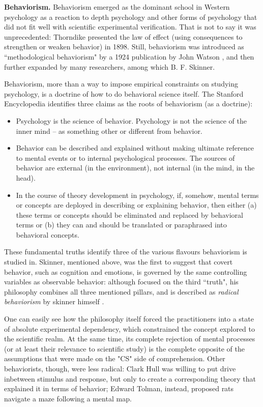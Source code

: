 \documentclass[../main.tex]{subfiles}
\begin{document}
\vspace{4pt}
\textbf{Behaviorism.}
Behaviorism emerged as the dominant school in Western psychology as a reaction to depth psychology and other forms of psychology that did not fit well with scientific experimental verification. That is not to say it was unprecedented: Thorndike presented the law of effect (using consequences to strengthen or weaken behavior) in 1898. Still, behaviorism was introduced as ``methodological behaviorism" by a 1924 publication by John Watson \cite{watsonUnverbalizedHumanBehavior1924}, and then further expanded by many researchers, among which B. F. Skinner.

Behaviorism, more than a way to impose empirical constraints on studying psychology, is a doctrine of how to do behavioral science itself. The Stanford Encyclopedia identifies three claims as the roots of behaviorism (as a doctrine):
\begin{itemize}
    \item Psychology is the science of behavior. Psychology is not the science of the inner mind – as something other or different from behavior.
    \item Behavior can be described and explained without making ultimate reference to mental events or to internal psychological processes. The sources of behavior are external (in the environment), not internal (in the mind, in the head).
    \item In the course of theory development in psychology, if, somehow, mental terms or concepts are deployed in describing or explaining behavior, then either (a) these terms or concepts should be eliminated and replaced by behavioral terms or (b) they can and should be translated or paraphrased into behavioral concepts.
\end{itemize}
These fundamental truths identify three of the various flavours behaviorism is studied in. Skinner, mentioned above, was the first to suggest that covert behavior, such as cognition and emotions, is governed by the same controlling variables as observable behavior: although focused on the third ``truth", his philosophy combines all three mentioned pillars, and is described as \textit{radical behaviorism} by skinner himself \cite{skinnerBehaviorism1974}.

One can easily see how the philosophy itself forced the practitioners into a state of absolute experimental dependency, which constrained the concept explored to the scientific realm. At the same time, its complete rejection of mental processes (or at least their relevance to scientific study) is the complete opposite of the assumptions that were made on the "CS" side of comprehension. Other behaviorists, though, were less radical: Clark Hull was willing to put drive inbetween stimulus and response, but only to create a corresponding theory that explained it in terms of behavior\cite{hullGoalAttractionDirecting1931}; Edward Tolman, instead, proposed rats navigate a maze following a mental map\cite{tolmanCognitiveMapsRats1948}.
\end{document}
